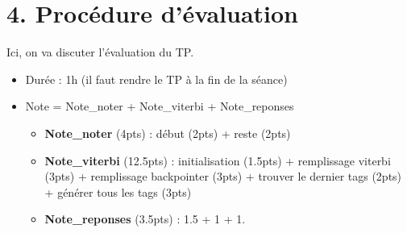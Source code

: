 \documentclass[11pt, a4paper]{article}
\begin{document}
\section*{4. Procédure d'évaluation}

Ici, on va discuter l'évaluation du TP.

\begin{itemize}
	\item Durée : 1h (il faut rendre le TP à la fin de la séance)
	\item Note = Note\_noter + Note\_viterbi + Note\_reponses
	\begin{itemize}
		\item \textbf{Note\_noter} (4pts) : début (2pts) + reste (2pts)
		\item \textbf{Note\_viterbi} (12.5pts) : initialisation (1.5pts) + remplissage viterbi (3pts) + remplissage backpointer (3pts) + trouver le dernier tags (2pts) + générer tous les tags (3pts)
		\item \textbf{Note\_reponses} (3.5pts) : 1.5 + 1 + 1.
	\end{itemize}
\end{itemize}
\end{document}
